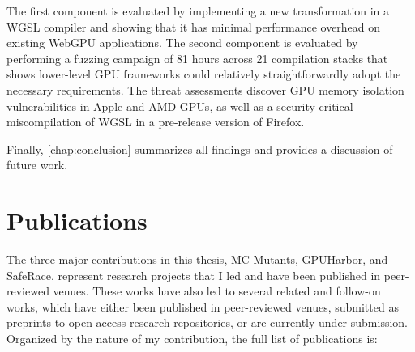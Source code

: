 The first component is evaluated by implementing a new transformation in a WGSL compiler and showing that it has minimal performance overhead on existing WebGPU applications. The second component is evaluated by performing a fuzzing campaign of 81 hours across 21 compilation stacks that shows lower-level GPU frameworks could relatively straightforwardly adopt the necessary requirements. The threat assessments discover GPU memory isolation vulnerabilities in Apple and AMD GPUs, as well as a security-critical miscompilation of WGSL in a pre-release version of Firefox.


Finally, \mychaplong\ref{chap:conclusion} summarizes all findings and provides a discussion of future work.


\section{Publications}
\label{sec:intro-pub}

The three major contributions in this thesis, MC Mutants, GPUHarbor, and SafeRace, represent research projects that I led and have been published in peer-reviewed venues. These works have also led to several related and follow-on works, which have either been published in peer-reviewed venues, submitted as preprints to open-access research repositories, or are currently under submission. Organized by the nature of my contribution, the full list of publications is:

